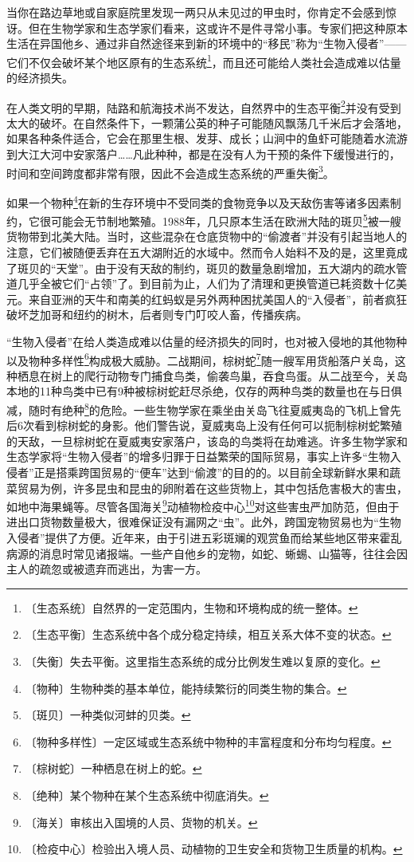 \documentclass[12pt,UTF-8,openany]{ctexbook}
\begin{document}
\begin{normalsize}
    
    当你在路边草地或自家庭院里发现一两只从未见过的甲虫时，你肯定不会感到惊讶。但在生物学家和生态学家们看来，这或许不是件寻常小事。专家们把这种原本生活在异国他乡、通过非自然途径来到新的环境中的“移民”称为“生物入侵者”——它们不仅会破坏某个地区原有的生态系统\footnote{〔生态系统〕自然界的一定范围内，生物和环境构成的统一整体。}，而且还可能给人类社会造成难以估量的经济损失。
    
    在人类文明的早期，陆路和航海技术尚不发达，自然界中的生态平衡\footnote{〔生态平衡〕生态系统中各个成分稳定持续，相互关系大体不变的状态。}并没有受到太大的破坏。在自然条件下，一颗蒲公英的种子可能随风飘荡几千米后才会落地，如果各种条件适合，它会在那里生根、发芽、成长；山涧中的鱼虾可能随着水流游到大江大河中安家落户……凡此种种，都是在没有人为干预的条件下缓慢进行的，时间和空间跨度都非常有限，因此不会造成生态系统的严重失衡\footnote{〔失衡〕失去平衡。这里指生态系统的成分比例发生难以复原的变化。}。
    
    如果一个物种\footnote{〔物种〕生物种类的基本单位，能持续繁衍的同类生物的集合。}在新的生存环境中不受同类的食物竞争以及天敌伤害等诸多因素制约，它很可能会无节制地繁殖。1988年，几只原本生活在欧洲大陆的斑贝\footnote{〔斑贝〕一种类似河蚌的贝类。}被一艘货物带到北美大陆。当时，这些混杂在仓底货物中的“偷渡者”并没有引起当地人的注意，它们被随便丢弃在五大湖附近的水域中。然而令人始料不及的是，这里竟成了斑贝的“天堂”。由于没有天敌的制约，斑贝的数量急剧增加，五大湖内的疏水管道几乎全被它们“占领”了。到目前为止，人们为了清理和更换管道已耗资数十亿美元。来自亚洲的天牛和南美的红蚂蚁是另外两种困扰美国人的“入侵者”，前者疯狂破坏芝加哥和纽约的树木，后者则专门叮咬人畜，传播疾病。
    
    “生物入侵者”在给人类造成难以估量的经济损失的同时，也对被入侵地的其他物种以及物种多样性\footnote{〔物种多样性〕一定区域或生态系统中物种的丰富程度和分布均匀程度。}构成极大威胁。二战期间，棕树蛇\footnote{〔棕树蛇〕一种栖息在树上的蛇。}随一艘军用货船落户关岛，这种栖息在树上的爬行动物专门捕食鸟类，偷袭鸟巢，吞食鸟蛋。从二战至今，关岛本地的11种鸟类中已有9种被棕树蛇赶尽杀绝，仅存的两种鸟类的数量也在与日俱减，随时有绝种\footnote{〔绝种〕某个物种在某个生态系统中彻底消失。}的危险。一些生物学家在乘坐由关岛飞往夏威夷岛的飞机上曾先后6次看到棕树蛇的身影。他们警告说，夏威夷岛上没有任何可以扼制棕树蛇繁殖的天敌，一旦棕树蛇在夏威夷安家落户，该岛的鸟类将在劫难逃。许多生物学家和生态学家将“生物入侵者”的增多归罪于日益繁荣的国际贸易，事实上许多“生物入侵者”正是搭乘跨国贸易的“便车”达到“偷渡”的目的的。以目前全球新鲜水果和蔬菜贸易为例，许多昆虫和昆虫的卵附着在这些货物上，其中包括危害极大的害虫，如地中海果蝇等。尽管各国海关\footnote{〔海关〕审核出入国境的人员、货物的机关。}动植物检疫中心\footnote{〔检疫中心〕检验出入境人员、动植物的卫生安全和货物卫生质量的机构。}对这些害虫严加防范，但由于进出口货物数量极大，很难保证没有漏网之“虫”。此外，跨国宠物贸易也为“生物入侵者”提供了方便。近年来，由于引进五彩斑斓的观赏鱼而给某些地区带来霍乱病源的消息时常见诸报端。一些产自他乡的宠物，如蛇、蜥蜴、山猫等，往往会因主人的疏忽或被遗弃而逃出，为害一方。
    

\end{normalsize}
\end{document}
